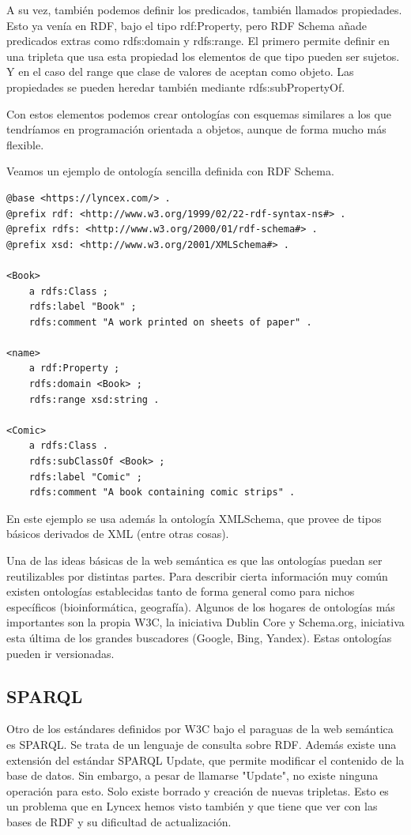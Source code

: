 \documentclass[12pt]{report} %
\begin{document}
A su vez, también podemos definir los predicados, también llamados propiedades. Esto ya venía en RDF, bajo el tipo rdf:Property, pero RDF Schema añade predicados extras como rdfs:domain y rdfs:range. El primero permite definir en una tripleta que usa esta propiedad los elementos de que tipo pueden ser sujetos. Y en el caso del range que clase de valores de aceptan como objeto. Las propiedades se pueden heredar también mediante rdfs:subPropertyOf.

Con estos elementos podemos crear ontologías con esquemas similares a los que tendríamos en programación orientada a objetos, aunque de forma mucho más flexible.

Veamos un ejemplo de ontología sencilla definida con RDF Schema.

\begin{lstlisting}
@base <https://lyncex.com/> .
@prefix rdf: <http://www.w3.org/1999/02/22-rdf-syntax-ns#> .
@prefix rdfs: <http://www.w3.org/2000/01/rdf-schema#> .
@prefix xsd: <http://www.w3.org/2001/XMLSchema#> .

<Book>
    a rdfs:Class ;
    rdfs:label "Book" ;
    rdfs:comment "A work printed on sheets of paper" .

<name>
    a rdf:Property ;
    rdfs:domain <Book> ;
    rdfs:range xsd:string .

<Comic>
    a rdfs:Class .
    rdfs:subClassOf <Book> ;
    rdfs:label "Comic" ;
    rdfs:comment "A book containing comic strips" .

\end{lstlisting}

En este ejemplo se usa además la ontología XMLSchema, que provee de tipos básicos derivados de XML (entre otras cosas).

Una de las ideas básicas de la web semántica es que las ontologías puedan ser reutilizables por distintas partes. Para describir cierta información muy común existen ontologías establecidas tanto de forma general como para nichos específicos (bioinformática, geografía). Algunos de los hogares de ontologías más importantes son la propia W3C, la iniciativa Dublin Core y Schema.org, iniciativa esta última de los grandes buscadores (Google, Bing, Yandex). Estas ontologías pueden ir versionadas.


\subsection{SPARQL}

Otro de los estándares definidos por W3C bajo el paraguas de la web semántica es SPARQL. Se trata de un lenguaje de consulta sobre RDF. Además existe una extensión del estándar SPARQL Update, que permite modificar el contenido de la base de datos. Sin embargo, a pesar de llamarse "Update", no existe ninguna operación para esto. Solo existe borrado y creación de nuevas tripletas. Esto es un problema que en Lyncex hemos visto también y que tiene que ver con las bases de RDF y su dificultad de actualización.
\end{document}
